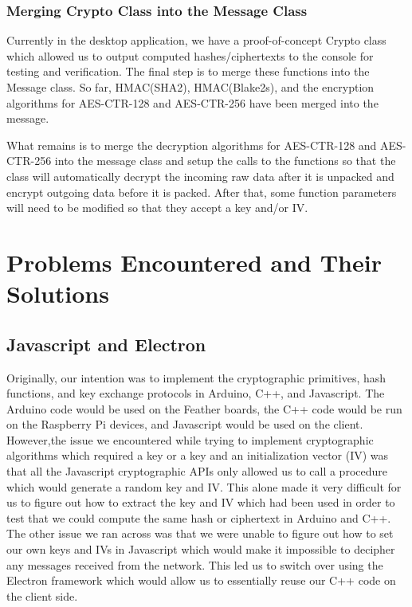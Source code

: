 \documentclass[tikz,a4paper,titlepage]{article}
\begin{document}
\subsubsection{Merging Crypto Class into the Message Class}

Currently in the desktop application, we have a proof-of-concept Crypto class which allowed us to output computed hashes/ciphertexts to the console for testing and verification. The final step is to merge these functions into the Message class. So far, HMAC(SHA2), HMAC(Blake2s), and the encryption algorithms for AES-CTR-128 and AES-CTR-256 have been merged into the message.

What remains is to merge the decryption algorithms for AES-CTR-128 and AES-CTR-256 into the message class and setup the calls to the functions so that the class will automatically decrypt the incoming raw data after it is unpacked and encrypt outgoing data before it is packed. After that, some function parameters will need to be modified so that they accept a key and/or IV.

\section{Problems Encountered and Their Solutions}
\subsection{Javascript and Electron}

Originally, our intention was to implement the cryptographic primitives, hash functions, and key exchange protocols in Arduino, C++, and Javascript. The Arduino code would be used on the Feather boards, the C++ code would be run on the Raspberry Pi devices, and Javascript would be used on the client. However,the issue we encountered while trying to implement cryptographic algorithms which required a key or a key and an initialization vector (IV) was that all the Javascript cryptographic APIs only allowed us to call a procedure which would generate a random key and IV. This alone made it very difficult for us to figure out how to extract the key and IV which had been used in order to test that we could compute the same hash or ciphertext in Arduino and C++. The other issue we ran across was that we were unable to figure out how to set our own keys and IVs in Javascript which would make it impossible to decipher any messages received from the network. This led us to switch over using the Electron framework which would allow us to essentially reuse our C++ code on the client side.
\end{document}
